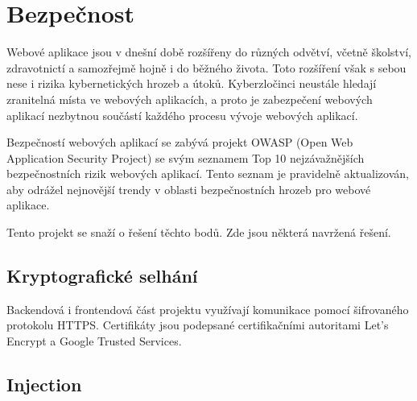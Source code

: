 \chapter{Bezpečnost}
Webové aplikace jsou v dnešní době rozšířeny do různých odvětví, včetně školství, zdravotnictí a samozřejmě hojně i do běžného života. Toto rozšíření však s sebou nese i rizika kybernetických hrozeb a útoků. Kyberzločinci neustále hledají zranitelná místa ve webových aplikacích, a proto je zabezpečení webových aplikací nezbytnou součástí každého procesu vývoje webových aplikací. \par
Bezpečností webových aplikací se zabývá projekt OWASP \cite{owasp}(Open Web Application Security Project) se svým seznamem Top 10 nejzávažnějších \cite{owasp10} bezpečnostních rizik webových aplikací. Tento seznam je pravidelně aktualizován, aby odrážel nejnovější trendy v oblasti bezpečnostních hrozeb pro webové aplikace.\par
Tento projekt se snaží o řešení těchto bodů. Zde jsou některá navržená řešení.\par
\section{Kryptografické selhání}\cite{crypto}
Backendová i frontendová část projektu využívají komunikace pomocí šifrovaného protokolu HTTPS. Certifikáty jsou podepsané certifikačními autoritami Let's Encrypt a Google Trusted Services.
\section{Injection}